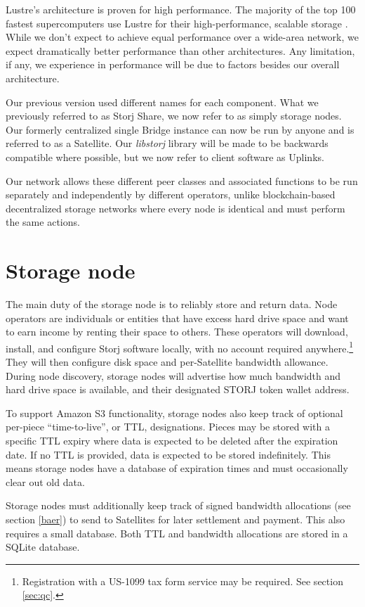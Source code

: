 \documentclass[8pt,fleqn,openany]{book}
\begin{document}
Lustre's architecture is proven for high performance. The majority of the top
100 fastest supercomputers use Lustre for their high-performance, scalable
storage \cite{lustre}. While we don't expect to achieve equal performance over
a wide-area network, we expect dramatically better performance than other
architectures. Any limitation, if any, we experience in performance will be
due to factors besides our overall architecture.

Our previous version used different names for each component. What we
previously referred to as Storj Share, we now refer to as simply storage nodes.
Our formerly centralized single Bridge instance can now be run by anyone and
is referred to as a Satellite.
Our {\em libstorj} library will be made to be backwards
compatible where possible, but we now refer to client software as
Uplinks.

Our network allows these different peer classes and associated functions to be
run separately and independently by different operators, unlike blockchain-based
decentralized storage networks where every node is identical and must perform the
same actions.

\section{Storage node}\label{sec:concrete-storage-nodes}

The main duty of the storage node is to reliably store and return data.
Node operators
are individuals or entities that have excess hard drive space and want to earn
income by renting their space to others. These operators will
download,
install, and configure Storj software locally, with no account required
anywhere.\footnote{Registration with a US-1099 tax form service may be
required. See section \ref{sec:qc}.}
They will then configure disk space and per-Satellite bandwidth allowance.
During node discovery, storage nodes will advertise how much bandwidth and
hard drive space is available, and their designated STORJ token wallet address.

To support Amazon S3 functionality,
storage nodes also keep track of optional per-piece ``time-to-live'', or TTL,
designations.
Pieces may be stored with a specific TTL expiry where data is expected to
be deleted after the expiration date. If no TTL is provided, data is expected
to be stored indefinitely. This means storage nodes have a database of
expiration
times and must occasionally clear out old data.

Storage nodes must additionally keep track of signed bandwidth allocations
(see section \ref{baer}) to send to
Satellites for later settlement and payment. This also requires a small
database. Both TTL and bandwidth allocations are stored in a SQLite
\cite{sqlite} database.
\end{document}

